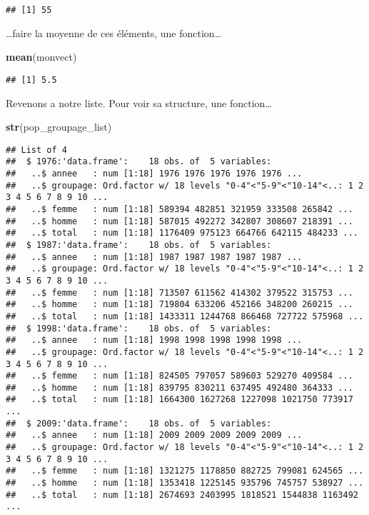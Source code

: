 \documentclass[]{book}
\newenvironment{Shaded}{\begin{snugshade}}{\end{snugshade}}
\newcommand{\KeywordTok}[1]{\textcolor[rgb]{0.13,0.29,0.53}{\textbf{#1}}}
\newcommand{\NormalTok}[1]{#1}
\begin{document}
\begin{verbatim}
## [1] 55
\end{verbatim}

\ldots{}faire la moyenne de ces éléments, une fonction\ldots{}

\begin{Shaded}
\begin{Highlighting}[]
\KeywordTok{mean}\NormalTok{(monvect)}
\end{Highlighting}
\end{Shaded}

\begin{verbatim}
## [1] 5.5
\end{verbatim}

Revenons a notre liste. Pour voir sa structure, une fonction\ldots{}

\begin{Shaded}
\begin{Highlighting}[]
\KeywordTok{str}\NormalTok{(pop_groupage_list)}
\end{Highlighting}
\end{Shaded}

\begin{verbatim}
## List of 4
##  $ 1976:'data.frame':    18 obs. of  5 variables:
##   ..$ annee   : num [1:18] 1976 1976 1976 1976 1976 ...
##   ..$ groupage: Ord.factor w/ 18 levels "0-4"<"5-9"<"10-14"<..: 1 2 3 4 5 6 7 8 9 10 ...
##   ..$ femme   : num [1:18] 589394 482851 321959 333508 265842 ...
##   ..$ homme   : num [1:18] 587015 492272 342807 308607 218391 ...
##   ..$ total   : num [1:18] 1176409 975123 664766 642115 484233 ...
##  $ 1987:'data.frame':    18 obs. of  5 variables:
##   ..$ annee   : num [1:18] 1987 1987 1987 1987 1987 ...
##   ..$ groupage: Ord.factor w/ 18 levels "0-4"<"5-9"<"10-14"<..: 1 2 3 4 5 6 7 8 9 10 ...
##   ..$ femme   : num [1:18] 713507 611562 414302 379522 315753 ...
##   ..$ homme   : num [1:18] 719804 633206 452166 348200 260215 ...
##   ..$ total   : num [1:18] 1433311 1244768 866468 727722 575968 ...
##  $ 1998:'data.frame':    18 obs. of  5 variables:
##   ..$ annee   : num [1:18] 1998 1998 1998 1998 1998 ...
##   ..$ groupage: Ord.factor w/ 18 levels "0-4"<"5-9"<"10-14"<..: 1 2 3 4 5 6 7 8 9 10 ...
##   ..$ femme   : num [1:18] 824505 797057 589603 529270 409584 ...
##   ..$ homme   : num [1:18] 839795 830211 637495 492480 364333 ...
##   ..$ total   : num [1:18] 1664300 1627268 1227098 1021750 773917 ...
##  $ 2009:'data.frame':    18 obs. of  5 variables:
##   ..$ annee   : num [1:18] 2009 2009 2009 2009 2009 ...
##   ..$ groupage: Ord.factor w/ 18 levels "0-4"<"5-9"<"10-14"<..: 1 2 3 4 5 6 7 8 9 10 ...
##   ..$ femme   : num [1:18] 1321275 1178850 882725 799081 624565 ...
##   ..$ homme   : num [1:18] 1353418 1225145 935796 745757 538927 ...
##   ..$ total   : num [1:18] 2674693 2403995 1818521 1544838 1163492 ...
\end{verbatim}
\end{document}
